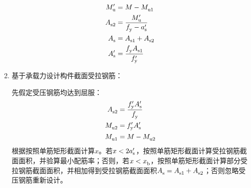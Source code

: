 \documentclass{article}
\begin{document}
\begin{enumerate}
\begin{align*}
                  \script{M}[\prime]{u} & = M-\script{M}{u1}                                                  \\
                  \script{A}{s2}        & = \frac{\script{M}[\prime]{u}}{\script{f}{y}-\script{a}[\prime]{s}} \\
                  \script{A}{s}         & = \script{A}{s1}+\script{A}{s2}                                     \\
                  \script{A}[\prime]{s} & = \frac{\script{f}{y}\script{A}{s1}}{\script{f}[\prime]{y}}
            \end{align*}
      \item 基于承载力设计构件截面受拉钢筋：
            \par 先假定受压钢筋均达到屈服：
            \begin{align*}
                  \script{A}{s2} & = \frac{\script{f}[\prime]{y}\script{A}[\prime]{s}}{\script{f}{y}} \\
                  \script{M}{u2} & = \script{f}[\prime]{y}\script{A}[\prime]{s}                       \\
                  \script{M}{u1} & = M-\script{M}{u2}
            \end{align*}
            根据按照单筋矩形截面计算$x$。若$x<2\script{a}[\prime]{s}$，按照单筋矩形截面计算受拉钢筋截面面积，并验算最小配筋率；否则，若$x<\script{x}{b}$，按照单筋矩形截面计算部分受拉钢筋截面面积，并相加得到受拉钢筋截面面积$\script{A}{s}=\script{A}{s1}+\script{A}{s2}$；否则忽略受压钢筋重新设计。
\end{enumerate}
\end{document}
